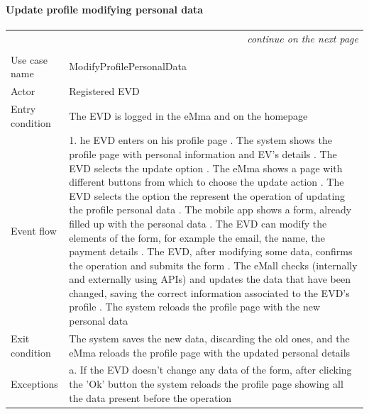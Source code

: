 \paragraph{Update profile modifying personal data}
\begin{center}
    \begin{longtable}{p{4cm} p{11cm}}
    \multicolumn{2}{r}{\itshape{continue on the next page}}\\
    \endfoot 
    \\
    \endlastfoot
    \hline
     Use case name &  ModifyProfilePersonalData\\
     \hline
     Actor & Registered EVD \\
     \hline
     Entry condition & The EVD is logged in the eMma and on the homepage \\
     \hline
     Event flow &   1. he EVD enters on his profile page \newline
                    2. The system shows the profile page with personal information and EV's details \newline
                    3. The EVD selects the update option \newline
                    4. The eMma shows a page with different buttons from which to choose the update action \newline
                    5. The EVD selects the option the represent the operation of updating the profile personal data \newline
                    6. The mobile app shows a form, already filled up with the personal data \newline
                    7. The EVD can modify the elements of the form, for example the email, the name, the payment details \newline
                    8. The EVD, after modifying some data, confirms the operation and submits the form \newline
                    9. The eMall checks (internally and externally using APIs) and updates the data that have been changed, saving the correct information associated to the EVD's profile \newline
                    10. The system reloads the profile page with the new personal data \\
     \hline
     Exit condition & The system saves the new data, discarding the old ones, and the eMma reloads the profile page with the updated personal details\\
     \hline
     Exceptions &   
        a. If the EVD doesn't change any data of the form, after clicking the 'Ok' button the system reloads the profile page showing all the data present before the operation \newline

\end{longtable}
\end{center}
